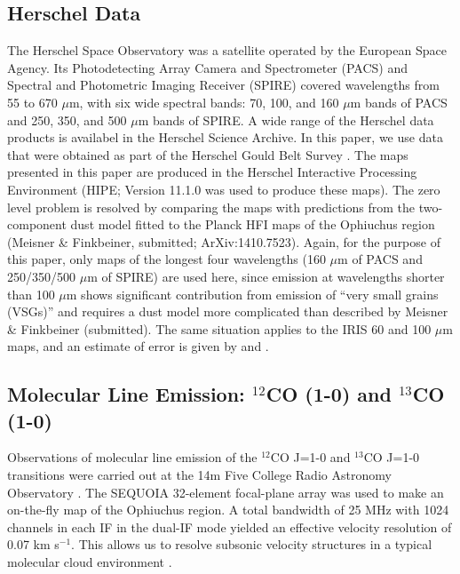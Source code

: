 \documentclass[11pt,a4paper]{emulateapj}
\begin{document}
\subsection{Herschel Data}
The Herschel Space Observatory was a satellite operated by the European Space Agency. Its Photodetecting Array Camera and Spectrometer (PACS) and Spectral and Photometric Imaging Receiver (SPIRE) covered wavelengths from 55 to 670 $\mu$m, with six wide spectral bands: 70, 100, and 160 $\mu$m bands of PACS and 250, 350, and 500 $\mu$m bands of SPIRE. A wide range of the Herschel data products is availabel in the Herschel Science Archive. In this paper, we use data that were obtained as part of the Herschel Gould Belt Survey \citep{Andr__2010}. The maps presented in this paper are produced in the Herschel Interactive Processing Environment (HIPE; Version 11.1.0 was used to produce these maps). The zero level problem is resolved by comparing the maps with predictions from the two-component dust model fitted to the Planck HFI maps of the Ophiuchus region (Meisner \& Finkbeiner, submitted; ArXiv:1410.7523). Again, for the purpose of this paper, only maps of the longest four wavelengths (160 $\mu$m of PACS and 250/350/500 $\mu$m of SPIRE) are used here, since emission at wavelengths shorter than 100 $\mu$m shows significant contribution from emission of ``very small grains (VSGs)'' and requires a dust model more complicated than described by Meisner \& Finkbeiner (submitted). The same situation applies to the IRIS 60 and 100 $\mu$m maps, and an estimate of error is given by \citet{Schnee_2006} and \citet{Schnee_2007}.

\subsection{Molecular Line Emission: $^{12}$CO (1-0) and $^{13}$CO (1-0)}
Observations of molecular line emission of the $^{12}$CO J=1-0 and $^{13}$CO J=1-0 transitions were carried out at the 14m Five College Radio Astronomy Observatory \citep[FCRAO;]{Ridge_2006}. The SEQUOIA 32-element focal-plane array was used to make an on-the-fly map of the Ophiuchus region. A total bandwidth of 25 MHz with 1024 channels in each IF in the dual-IF mode yielded an effective velocity resolution of 0.07 km s$^{-1}$. This allows us to resolve subsonic velocity structures in a typical molecular cloud environment \citep[with a temperature of 15 K and an average molecular weight of 2.33 m$_H$;]{Carey_1998,Pillai_2006}.
\end{document}
